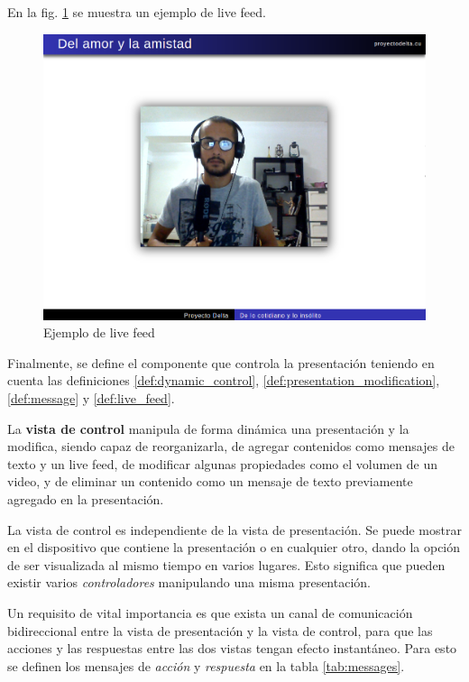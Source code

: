 		En la fig. \ref{fig:live_feed} se muestra un ejemplo de live feed.

		\begin{figure}[tb]
			\centering
			\includegraphics[width=12cm]{img/live_feed}
			\caption{Ejemplo de live feed}
			\label{fig:live_feed}
		\end{figure}

		Finalmente, se define el componente que controla la presentación teniendo en cuenta las definiciones \ref{def:dynamic_control}, \ref{def:presentation_modification}, \ref{def:message} y \ref{def:live_feed}.

		\begin{definition}
		\label{def:control_view}
			La \textbf{vista de control} manipula de forma dinámica una presentación y la modifica, siendo capaz de reorganizarla, de agregar contenidos como mensajes de texto y un live feed, de modificar algunas propiedades como el volumen de un video, y de eliminar un contenido como un mensaje de texto previamente agregado en la presentación. 
		\end{definition}		
		
		La vista de control es independiente de la vista de presentación. Se puede mostrar en el dispositivo que contiene la presentación o en cualquier otro, dando la opción de ser visualizada al mismo tiempo en varios lugares. Esto significa que pueden existir varios \textit{controladores} manipulando una misma presentación.

		Un requisito de vital importancia es que exista un canal de comunicación bidireccional entre la vista de presentación y la vista de control, para que las acciones y las respuestas entre las dos vistas tengan efecto instantáneo. Para esto se definen los mensajes de \textit{acción} y \textit{respuesta} en la tabla \ref{tab:messages}.

